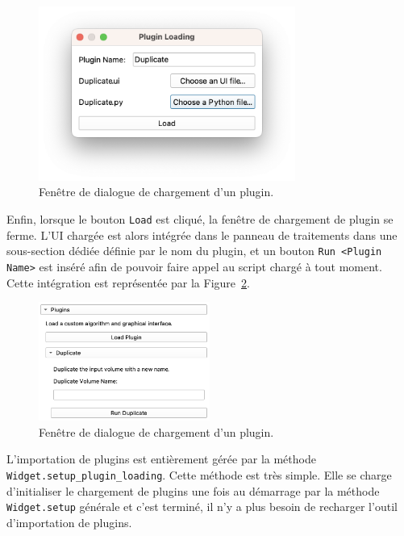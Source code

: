 \documentclass{article}
\begin{document}
{{        \begin{figure}[!ht]
            \centering
            \includegraphics[width=0.75\textwidth]{images/plugin-loading-ui.png}
            \caption{Fenêtre de dialogue de chargement d'un plugin.}
            \label{fig:plugins-loading-ui}
        \end{figure}

        Enfin, lorsque le bouton \texttt{Load} est cliqué, la fenêtre de chargement de plugin se ferme. L'UI chargée est alors intégrée dans le panneau de traitements dans une sous-section dédiée définie par le nom du plugin, et un bouton \texttt{Run <Plugin Name>} est inséré afin de pouvoir faire appel au script chargé à tout moment. Cette intégration est représentée par la Figure~\ref{fig:plugins-integration-ui}.

        \begin{figure}[!ht]
            \centering
            \includegraphics[width=0.5\textwidth]{images/plugins-integration-ui.png}
            \caption{Fenêtre de dialogue de chargement d'un plugin.}
            \label{fig:plugins-integration-ui}
        \end{figure}

        \bigskip

        L'importation de plugins est entièrement gérée par la méthode \texttt{Widget.setup\_plugin\_loading}. Cette méthode est très simple. Elle se charge d'initialiser le chargement de plugins une fois au démarrage par la méthode \texttt{Widget.setup} générale et c'est terminé, il n'y a plus besoin de recharger l'outil d'importation de plugins.

}}
\end{document}
